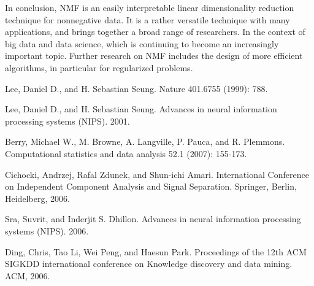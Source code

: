 \documentclass[11pt]{article}
\begin{document}
In conclusion, NMF is an easily interpretable linear dimensionality reduction technique for nonnegative data. It is a rather versatile technique with many applications, and brings together a broad range of researchers. In the context of big data and data science, which is continuing to become an increasingly important topic. Further research on NMF includes the design of more efficient algorithms, in particular for regularized problems.





\begin{thebibliography}{}

Lee, Daniel D., and H. Sebastian Seung.
\newblock Nature 401.6755 (1999): 788.

Lee, Daniel D., and H. Sebastian Seung.
\newblock Advances in neural information processing systems (NIPS). 2001.

Berry, Michael W., M. Browne, A. Langville, P. Pauca, and R. Plemmons.
\newblock Computational statistics and data analysis 52.1 (2007): 155-173.

Cichocki, Andrzej, Rafal Zdunek, and Shun-ichi Amari.
\newblock International Conference on Independent Component Analysis and Signal Separation. Springer, Berlin, Heidelberg, 2006.

Sra, Suvrit, and Inderjit S. Dhillon.
\newblock Advances in neural information processing systems (NIPS). 2006.

Ding, Chris, Tao Li, Wei Peng, and Haesun Park.
\newblock  Proceedings of the 12th ACM SIGKDD international conference on Knowledge discovery and data mining. ACM, 2006.


\end{thebibliography}
\end{document}
